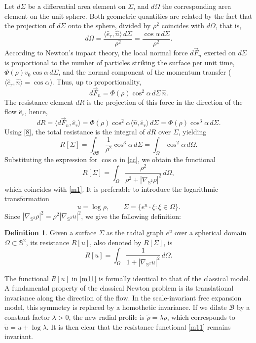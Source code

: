 \documentclass[a4paper,12pt]{amsart}
\theoremstyle{plain}
\theoremstyle{definition}
\newtheorem{definition}[theorem]{Definition}
\def\s{\mathbb S}
\begin{document}
Let $d\Sigma$ be a differential area element on $\Sigma$, and $d\Omega$ the corresponding area element on the unit sphere. Both geometric quantities are related by the fact that the projection of $d\Sigma$ onto the sphere, divided by $\rho^2$ coincides with $d\Omega$, that is,  
\begin{equation}\label{8}
 d\Omega=\frac{\langle\hat{e}_r,\hat{n} \rangle\, d\Sigma}{\rho^2}= \frac{\cos\alpha \, d\Sigma }{\rho^2}.
\end{equation}
According to Newton's impact theory, the local normal force $d\vec{F}_n$ exerted on $d\Sigma$ is proportional to the number of particles striking the surface per unit time, $\Phi(\rho) v_0\cos \alpha \, d\Sigma$, and the normal component of the momentum transfer ($\langle \hat{e}_r, \hat{n}\rangle = \cos \alpha$). Thus, up to proportionality, 
$$d\vec{F}_n =\Phi(\rho) \cos^2 \alpha \, d\Sigma \, \hat{n}.$$
 The resistance element $dR$ is the projection of this force in the direction of the flow $\hat{e}_r$, hence, 
$$dR=\langle d\vec{F}_n,\hat{e}_r\rangle=\Phi(\rho) \cos^2 \alpha \langle\hat{n},\hat{e}_r\rangle\, d\Sigma=\Phi(\rho) \cos^3 \alpha \, d\Sigma.$$
 Using \eqref{8}, the total resistance is the integral of $dR$ over $\Sigma$, yielding
\begin{equation*}
 R[\Sigma] = \int_{\partial\mathcal{B}} \frac{1}{\rho^2} \cos^3 \alpha \, d\Sigma = \int_{\Omega} \cos^2 \alpha \, d\Omega.
\end{equation*}
Substituting the expression for $\cos \alpha$ in \eqref{cc}, we obtain the functional
\begin{equation*}
 R[\Sigma] = \int_{\Omega} \frac{\rho^2}{\rho^2 + |\nabla_{\mathbb{S}^2} \rho|^2} \, d\Omega,
\end{equation*}
which coincides with \eqref{m1}. It is preferable to introduce the logarithmic transformation 
$$u = \log \rho,\qquad \Sigma=\{ e^u\cdot\xi\colon \xi\in\Omega\}.$$ 
 Since $|\nabla_{\mathbb{S}^2} \rho|^2=\rho^2 |\nabla_{\mathbb{S}^2} u|^2$, we give the following definition: 

\begin{definition} 
Given a surface $\Sigma$ as the radial graph $e^u$ over a spherical domain $\Omega\subset\s^2$, its resistance $R[u]$, also denoted by $R[\Sigma]$, is 
\begin{equation} \label{m11}
 R[u] = \int_{\Omega} \frac{1}{1 + |\nabla_{\mathbb{S}^2} u|^2} \, d\Omega.
\end{equation}
\end{definition}
 The functional $R[u]$ in \eqref{m11} is formally identical to that of the classical model. A fundamental property of the classical Newton problem is its translational invariance along the direction of the flow. In the scale-invariant free expansion model, this symmetry is replaced by a homothetic invariance. If we dilate $\mathcal{B}$ by a constant factor $\lambda > 0$, the new radial profile is $\tilde{\rho} = \lambda \rho$, which corresponds to $\tilde{u} = u + \log \lambda$. It is then clear that the resistance functional \eqref{m11} remains invariant. 
\end{document}

